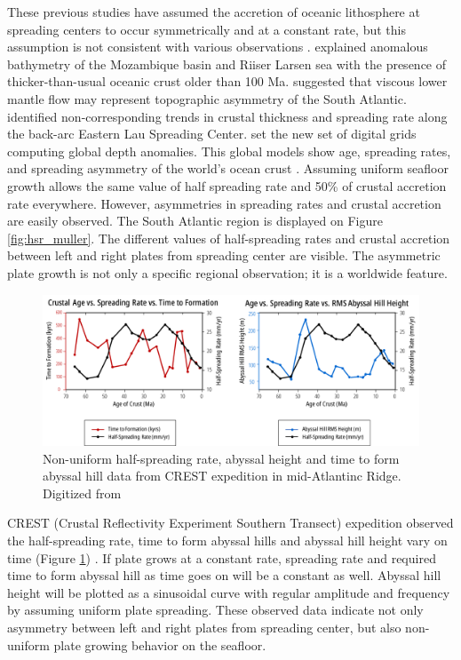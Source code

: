 \documentclass[letterpaper,12pt,notitle]{memphisthesis}                     %
\begin{document}
These previous studies have assumed the accretion of oceanic lithosphere at spreading centers to occur symmetrically and at a constant rate, but this assumption is not consistent with various observations \citep{Castelino2016, Flament2014, Martinez2006, Muller1998, Muller2008, Fedotova2017}. \citet{Castelino2016} explained anomalous bathymetry of the Mozambique basin and Riiser Larsen sea with the presence of thicker-than-usual oceanic crust older than 100 Ma. \citet{Flament2014} suggested that viscous lower mantle flow may represent topographic asymmetry of the South Atlantic. \citet{Martinez2006} identified non-corresponding trends in crustal thickness and spreading rate along the back-arc Eastern Lau Spreading Center. \citet{Muller2008} set the new set of digital grids computing global depth anomalies. This global models show age, spreading rates, and spreading asymmetry of the world’s ocean crust . Assuming uniform seafloor growth allows the same value of half spreading rate and 50\% of crustal accretion rate everywhere. However, asymmetries in spreading rates and crustal accretion are easily observed. The South Atlantic region is displayed on Figure \ref{fig:hsr_muller}. The different values of half-spreading rates and crustal accretion between left and right plates from spreading center are visible. The asymmetric plate growth is not only a specific regional observation; it is a worldwide feature.
%
\begin{figure}[!htb]
	\centering
	\includegraphics[width=0.99\linewidth]{./figs/hsrgraph1.pdf}
	\caption{Non-uniform half-spreading rate, abyssal height and time to form abyssal hill data from CREST expedition in mid-Atlantinc Ridge. Digitized from \citet{Fedotova2017}}
	\label{fig:hsr_fedotova}
\end{figure}

CREST (Crustal Reflectivity Experiment Southern Transect) expedition observed the half-spreading rate, time to form abyssal hills and abyssal hill height vary on time (Figure \ref{fig:hsr_fedotova}) \citep{Fedotova2017}. %
If plate grows at a constant rate, spreading rate and required time to form abyssal hill as time goes on will be a constant as well. Abyssal hill height will be plotted as a sinusoidal curve with regular amplitude and frequency by assuming uniform plate spreading. These observed data indicate not only asymmetry between left and right plates from spreading center, but also non-uniform plate growing behavior on the seafloor.
\end{document}
